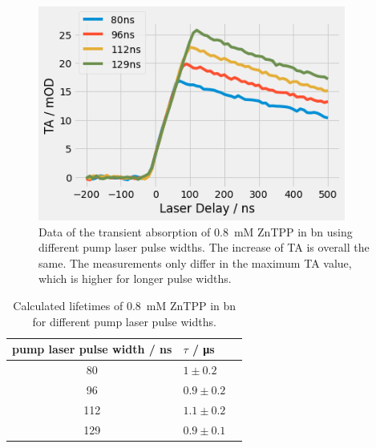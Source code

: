 \begin{figure}[h]
    \centering
    \includegraphics[width = 0.9\textwidth]{Bilder/Auswertung/TRAS/pulsewidth.png}
    \caption{Data of the transient absorption of \SI{0.8}{\milli\nauticalmile} ZnTPP in bn using different pump laser pulse widths. The increase of TA is overall the same. The measurements only differ in the maximum TA value, which is higher for longer pulse widths.}
    \label{fig:pulsewidth}
\end{figure}

\begin{table}[ht]
    \centering
    \begin{tabular}{clc}
        \toprule
        pump laser pulse width / ns & $\tau$ / \si{\micro\second} \\
        \midrule
        80  &     $1 \pm 0.2$ \\
        96  &     $0.9 \pm 0.2$\\
        112 &     $1.1 \pm 0.2$ \\
        129 &     $0.9 \pm 0.1$\\
        \bottomrule
    \end{tabular}
    \caption{Calculated lifetimes of \SI{0.8}{\milli\nauticalmile} ZnTPP in bn for different pump laser pulse widths.}
    \label{tab:pulsewidth}
\end{table}